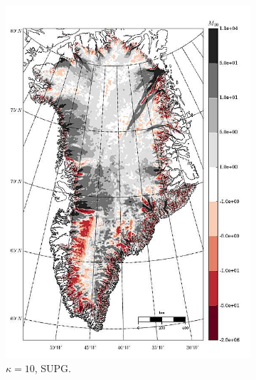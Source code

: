 \begin{figure}
\begin{subfigure}[b]{0.25\linewidth}
    \includegraphics[width=\linewidth]{images/balance_velocity/greenland/misfit_5H_kappa_10_SUPG.jpg}
  \caption{$\kappa = 10$, SUPG.}
  \label{greenland_bv_image_kappa_10_SUPG_misfit}
  \end{subfigure}
  \begin{subfigure}[b]{0.25\linewidth}

\end{subfigure}
\end{figure}
